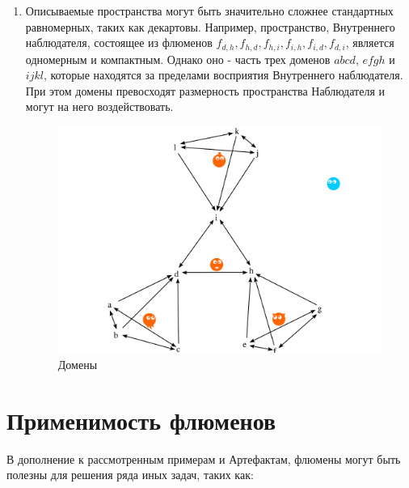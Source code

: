 \documentclass[final]{article}
\begin{document}
            \begin{enumerate}

                \item Описываемые пространства могут быть значительно сложнее 
                стандартных равномерных, таких как декартовы. Например, 
                пространство, Внутреннего наблюдателя, состоящее из флюменов 
                \(f_{d,h}, f_{h,d}, f_{h,i}, f_{i,h}, f_{i,d}, f_{d,i}\), является 
                одномерным и компактным. Однако оно - часть трех доменов \(abcd\), 
                \(efgh\) и \(ijkl\), которые находятся за пределами восприятия 
                Внутреннего наблюдателя. При этом домены превосходят размерность 
                пространства Наблюдателя и могут на него воздействовать.

                \begin{figure}[H]
                    \centering
                    \includegraphics[width=\textwidth]{./domains.png}
                    \caption{Домены}
                    \label{fig:image}
                \end{figure}

            \end{enumerate}

    \section{Применимость флюменов}

        В дополнение к рассмотренным примерам и Артефактам, флюмены могут быть 
        полезны для решения ряда иных задач, таких как:
\end{document}
